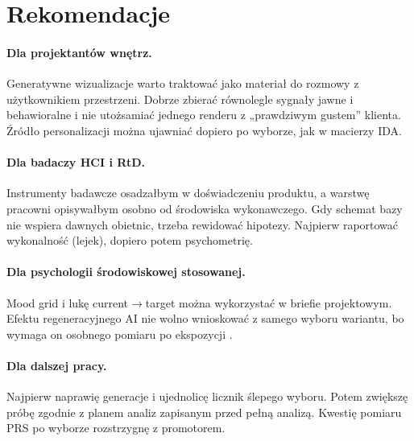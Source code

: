 \section{Rekomendacje}
\label{ch10:sec:rekomendacje}

\paragraph{Dla projektantów wnętrz.}
Generatywne wizualizacje warto traktować jako materiał do rozmowy z użytkownikiem przestrzeni. Dobrze zbierać równolegle sygnały jawne i behawioralne i nie utożsamiać jednego renderu z „prawdziwym gustem” klienta. Źródło personalizacji można ujawniać dopiero po wyborze, jak w macierzy IDA.

\paragraph{Dla badaczy HCI i RtD.}
Instrumenty badawcze osadzałbym w doświadczeniu produktu, a warstwę pracowni opisywałbym osobno od środowiska wykonawczego. Gdy schemat bazy nie wspiera dawnych obietnic, trzeba rewidować hipotezy. Najpierw raportować wykonalność (lejek), dopiero potem psychometrię.

\paragraph{Dla psychologii środowiskowej stosowanej.}
Mood grid i lukę current$\rightarrow$target można wykorzystać w briefie projektowym. Efektu regeneracyjnego AI nie wolno wnioskować z samego wyboru wariantu, bo wymaga on osobnego pomiaru po ekspozycji \parencite{kaplan1995restorative}.

\paragraph{Dla dalszej pracy.}
Najpierw naprawię generacje i ujednolicę licznik ślepego wyboru. Potem zwiększę próbę zgodnie z planem analiz zapisanym przed pełną analizą. Kwestię pomiaru PRS po wyborze rozstrzygnę z promotorem.
